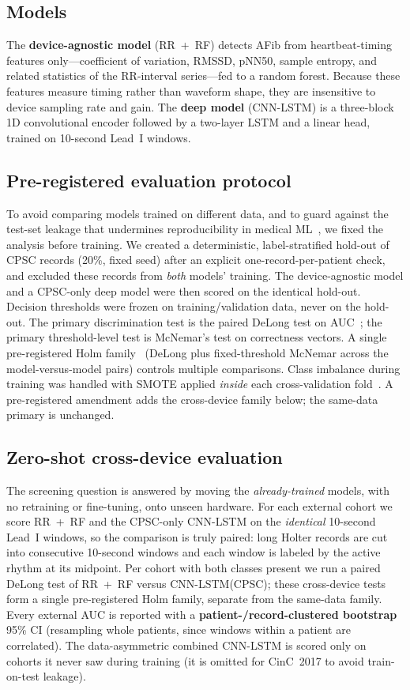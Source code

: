 \documentclass[]{ws-procs9x6}
\begin{document}
\subsection{Models}
The \textbf{device-agnostic model} (RR~+~RF) detects AFib from heartbeat-timing
features only---coefficient of variation, RMSSD, pNN50, sample entropy, and
related statistics of the RR-interval series---fed to a random forest. Because
these features measure timing rather than waveform shape, they are insensitive to
device sampling rate and gain. The \textbf{deep model} (CNN-LSTM) is a three-block
1D convolutional encoder followed by a two-layer LSTM and a linear head, trained
on 10-second Lead~I windows.

\subsection{Pre-registered evaluation protocol}
To avoid comparing models trained on different data, and to guard against the
test-set leakage that undermines reproducibility in medical
ML~\cite{kapoor2023leakage}, we fixed the analysis before training. We created a
deterministic, label-stratified hold-out of CPSC records (20\%, fixed seed) after
an explicit one-record-per-patient check, and excluded these records from
\emph{both} models' training. The device-agnostic model and a CPSC-only deep model
were then scored on the identical hold-out. Decision thresholds were frozen on
training/validation data, never on the hold-out. The primary discrimination test
is the paired DeLong test on AUC~\cite{delong1988comparing,sun2014fast}; the
primary threshold-level test is McNemar's test on correctness vectors. A single
pre-registered Holm family~\cite{holm1979simple} (DeLong plus fixed-threshold
McNemar across the model-versus-model pairs) controls multiple comparisons.
Class imbalance during training was handled with SMOTE applied \emph{inside} each
cross-validation fold~\cite{chawla2002smote}. A pre-registered amendment adds the
cross-device family below; the same-data primary is unchanged.

\subsection{Zero-shot cross-device evaluation}
The screening question is answered by moving the \emph{already-trained} models,
with no retraining or fine-tuning, onto unseen hardware. For each external cohort
we score RR~+~RF and the CPSC-only CNN-LSTM on the \emph{identical} 10-second
Lead~I windows, so the comparison is truly paired: long Holter records are cut
into consecutive 10-second windows and each window is labeled by the active rhythm
at its midpoint. Per cohort with both classes present we run a paired DeLong test
of RR~+~RF versus CNN-LSTM(CPSC); these cross-device tests form a single
pre-registered Holm family, separate from the same-data family. Every external AUC
is reported with a \textbf{patient-/record-clustered bootstrap} 95\% CI (resampling
whole patients, since windows within a patient are correlated). The
data-asymmetric combined CNN-LSTM is scored only on cohorts it never saw during
training (it is omitted for CinC~2017 to avoid train-on-test leakage).
\end{document}

